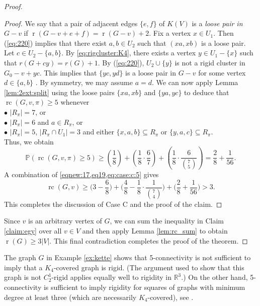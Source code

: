 \documentclass[11pt,a4paper]{article}
\theoremstyle{definition}
\DeclareMathOperator{\rr}{r}
\DeclareMathOperator{\rc}{rc}
\newcommand{\R}{\mathbb{R}}
\newcommand{\Prob}{\mathbb{P}}
\begin{document}
\begin{proof}
\begin{proof}
        We say that a pair of adjacent edges $\{e,f\}$ of $K(V)$ is a {\it loose pair in $G-v$} if %
        $\rr(G-v+e+f)=\rr(G-v)+2$.
        Fix a vertex $x\in U_1$. Then (\ref{eq:220}) implies that there exist $a,b\in U_2$ such that $(xa,xb)$ is a loose pair. 
        Let $c\in U_2-\{a,b\}$. By \eqref{eq:rigcluster:K4}, there exists a vertex $y\in U_1-\{x\}$ such that 
        $r(G+cy)=r(G)+1$.
        By (\ref{eq:220}), $U_2\cup \{y\}$ is not a rigid cluster in $G_0-v+yc$. This implies that 
        $\{yc,yd\}$ is a loose pair in $G-v$ for some vertex $d\in \{a,b\}$ . By symmetry, we may assume $a=d$.
         We can now apply Lemma \ref{lem:2ext:split} using the loose pairs $\{xa,xb\}$ and $\{ya,yc\}$ to deduce that $\rc(G,v,\pi)\geq 5$  whenever\\
        $\bullet$  $|R_\pi|=7$, or\\
        $\bullet$ $|R_\pi|=6$ and $a\in R_\pi$, or\\
        $\bullet$ $|R_\pi|=5$, $|R_\pi\cap U_1|= 3$ and either $\{x,a,b\}\subseteq R_\pi$ or $\{y,a,c\}\subseteq R_\pi$.\\
        Thus, we obtain 
        \begin{equation}\label{eq:case:c:5}
            \Prob(\rc(G,v,\pi)\geq 5)\geq \left(\frac{1}{8}\right)+\left(\frac{1}{8}\cdot \frac{6}{7}\right)+\left(\frac{1}{8}\cdot\frac{6}{\binom{7}{5}}\right)=\frac{2}{8}+\frac{1}{56}.
        \end{equation}
        A combination of \cref{eqnew:17,eq19,eq:case:c:5} gives 
        $$\rc(G,v)\geq \Big(3-\frac{6}{8}\Big)+\Big( \frac{4}{8}-\frac{1}{8}\cdot \frac{1}{\binom{7}{4}}\Big)+\Big(\frac{2}{8}+\frac{1}{56}\Big)>3.$$
This completes the discussion of Case C and the proof of the claim.                                \end{proof}	

Since $v$ is an arbitrary vertex of $G$, we can sum the inequality in Claim \ref{claim:egy}	over all $v\in V$ and then apply 
    Lemma \ref{lem:rc_sum}
    to obtain 
    $\rr(G)\geq 3|V|$. This final contradiction completes the proof of the theorem.
\end{proof}





The graph $G$ in Example \ref{ex:kette} shows that 5-connectivity is not sufficient to imply that a $K_4$-covered graph is rigid. (The argument used to show that this graph is not $C_2^1$-rigid applies equally well to rigidity in $\R^3$.)
On the other hand, 5-connectivity is sufficient to imply rigidity for 
squares of graphs with minimum degree at least three (which are necessarily $K_4$-covered),
see \cite[Theorem 3.1]{Jsquare}.
\end{document}
